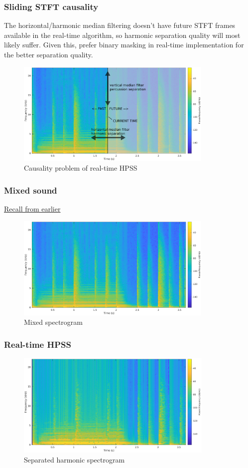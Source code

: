 \documentclass{beamer}
\begin{document}
\begin{frame}
	\frametitle{Sliding STFT causality}
	The horizontal/harmonic median filtering doesn't have future STFT frames available in the real-time algorithm, so harmonic separation quality will most likely suffer. Given this, prefer binary masking in real-time implementation for the better separation quality.
	\begin{figure}
	\includegraphics[height=5cm]{../images/hpss_causality.png}
		\caption{Causality problem of real-time HPSS}
	\end{figure}
\end{frame}

\begin{frame}
	\frametitle{Mixed sound}
	\href{run:../audio/mixed.wav}{Recall from earlier}\
	\begin{figure}
	\includegraphics[height=5cm]{../images/mixedspecgram.png}
		\caption{Mixed spectrogram}
	\end{figure}
\end{frame}

\begin{frame}
	\frametitle{Real-time HPSS}
	\begin{figure}
	\includegraphics[height=5cm]{../images/harm_realtime.png}
		\caption{Separated harmonic spectrogram}
	\end{figure}
\end{frame}
\end{document}
